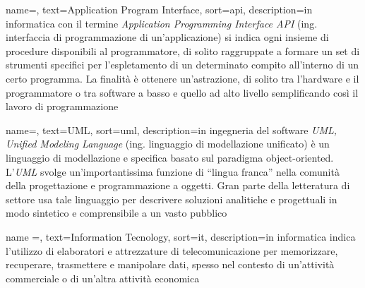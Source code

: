 
\renewcommand{\acronymname}{Acronimi e abbreviazioni}






{
    name=,
    text=Application Program Interface,
    sort=api,
    description={in informatica con il termine \emph{Application Programming Interface API} (ing. interfaccia di programmazione di un'applicazione) si indica ogni insieme di procedure disponibili al programmatore, di solito raggruppate a formare un set di strumenti specifici per l'espletamento di un determinato compito all'interno di un certo programma. La finalità è ottenere un'astrazione, di solito tra l'hardware e il programmatore o tra software a basso e quello ad alto livello semplificando così il lavoro di programmazione}
}

{
    name=,
    text=UML,
    sort=uml,
    description={in ingegneria del software \emph{UML, Unified Modeling Language} (ing. linguaggio di modellazione unificato) è un linguaggio di modellazione e specifica basato sul paradigma object-oriented. L'\emph{UML} svolge un'importantissima funzione di ``lingua franca'' nella comunità della progettazione e programmazione a oggetti. Gran parte della letteratura di settore usa tale linguaggio per descrivere soluzioni analitiche e progettuali in modo sintetico e comprensibile a un vasto pubblico}
}

{
    name =,
    text=Information Tecnology,
    sort=it,
    description={in informatica indica l'utilizzo di elaboratori e attrezzature di telecomunicazione per memorizzare, recuperare, trasmettere e manipolare dati, spesso nel contesto di un'attività commerciale o di un'altra attività economica}
}

